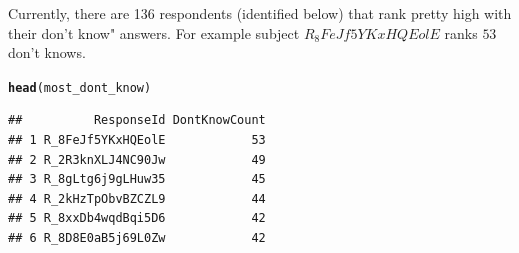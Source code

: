 \documentclass{article}\usepackage[]{graphicx}\usepackage[]{xcolor}
\makeatletter
\newcommand{\hldef}[1]{\textcolor[rgb]{0.345,0.345,0.345}{#1}}%
\newcommand{\hlkwd}[1]{\textcolor[rgb]{0.737,0.353,0.396}{\textbf{#1}}}%
\newenvironment{kframe}{%
 \def\at@end@of@kframe{}%
 \ifinner\ifhmode%
  \def\at@end@of@kframe{\end{minipage}}%
  \begin{minipage}{\columnwidth}%
 \fi\fi%
 \def\FrameCommand##1{\hskip\@totalleftmargin \hskip-\fboxsep
 \colorbox{shadecolor}{##1}\hskip-\fboxsep
     \hskip-\linewidth \hskip-\@totalleftmargin \hskip\columnwidth}%
 \MakeFramed {\advance\hsize-\width
   \@totalleftmargin\z@ \linewidth\hsize
   \@setminipage}}%
 {\par\unskip\endMakeFramed%
 \at@end@of@kframe}
\newenvironment{knitrout}{}{} %
\makeatother
\begin{document}
Currently, there are 136 respondents (identified below) that rank pretty high with their don't know" answers. For example subject $R_8FeJf5YKxHQEolE$ ranks $53$ don't knows.  

\begin{knitrout}
\color{fgcolor}\begin{kframe}
\begin{alltt}
\hlkwd{head}\hldef{(most_dont_know)}
\end{alltt}
\begin{verbatim}
##          ResponseId DontKnowCount
## 1 R_8FeJf5YKxHQEolE            53
## 2 R_2R3knXLJ4NC90Jw            49
## 3 R_8gLtg6j9gLHuw35            45
## 4 R_2kHzTpObvBZCZL9            44
## 5 R_8xxDb4wqdBqi5D6            42
## 6 R_8D8E0aB5j69L0Zw            42
\end{verbatim}
\end{kframe}
\end{knitrout}
\end{document}
